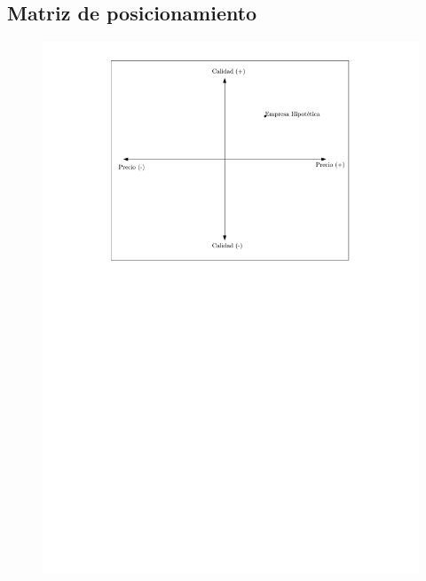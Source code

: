 \documentclass{article}
\begin{document}
\subsection{Matriz de posicionamiento}
\begin{figure}[H]
    \centering
    \includegraphics[]{figs/MatrixHipo} 
\end{figure}



\end{document}
